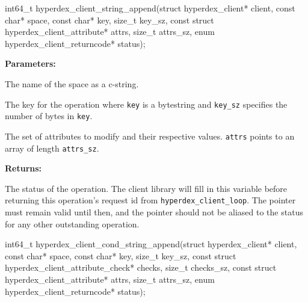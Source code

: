 \funcsep
\begin{ccode}
int64_t hyperdex_client_string_append(struct hyperdex_client* client,
                const char* space,
                const char* key, size_t key_sz,
                const struct hyperdex_client_attribute* attrs, size_t attrs_sz,
                enum hyperdex_client_returncode* status);
\end{ccode}
\funcdesc 

\noindent\textbf{Parameters:}
\begin{description}[labelindent=\widthof{{\texttt{attrs}, \texttt{attrs\_sz}}},leftmargin=*,noitemsep,nolistsep,align=right]
\item[\texttt{space}] The name of the space as a c-string.
\item[\texttt{key}, \texttt{key\_sz}] The key for the operation where \texttt{key} is a bytestring and \texttt{key\_sz} specifies the number of bytes in \texttt{key}.
\item[\texttt{attrs}, \texttt{attrs\_sz}] The set of attributes to modify and their respective values.  \texttt{attrs} points to an array of length \texttt{attrs\_sz}.
\end{description}

\noindent\textbf{Returns:}
\begin{description}[labelindent=\widthof{{\texttt{status}}},leftmargin=*,noitemsep,nolistsep,align=right]
\item[\texttt{status}] The status of the operation.  The client library will fill in this variable before returning this operation's request id from \texttt{hyperdex\_client\_loop}.  The pointer must remain valid until then, and the pointer should not be aliased to the status for any other outstanding operation.
\end{description}

\funcsep
\begin{ccode}
int64_t hyperdex_client_cond_string_append(struct hyperdex_client* client,
                const char* space,
                const char* key, size_t key_sz,
                const struct hyperdex_client_attribute_check* checks, size_t checks_sz,
                const struct hyperdex_client_attribute* attrs, size_t attrs_sz,
                enum hyperdex_client_returncode* status);
\end{ccode}
\funcdesc 

